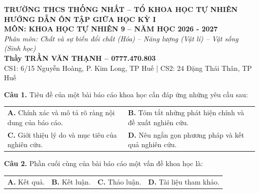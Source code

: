 \documentclass{article}
\begin{document}

\begin{center}
\vspace*{0.6cm}
{\fontsize{24}{30}\selectfont \textbf{TRƯỜNG THCS THỐNG NHẤT -- TỔ KHOA HỌC TỰ NHIÊN}}\\[0.6cm]
{\fontsize{34}{42}\selectfont \textbf{\color{brandGreen}HƯỚNG DẪN ÔN TẬP GIỮA HỌC KỲ I}}\\[0.4cm]
{\fontsize{28}{36}\selectfont \textbf{MÔN: KHOA HỌC TỰ NHIÊN 9 -- NĂM HỌC 2026 - 2027}}\\[1.0cm]
{\fontsize{24}{32}\selectfont \textit{Phân môn: Chất và sự biến đổi chất (Hóa) -- Năng lượng (Vật lí) -- Vật sống (Sinh học)}}\\[1.2cm]
{\fontsize{24}{30}\selectfont \textbf{\color{brandRed}Thầy TRẦN VĂN THẠNH -- 0777.470.803}}\\[0.3cm]
{\fontsize{20}{26}\selectfont CS1: 6/15 Nguyễn Hoàng, P. Kim Long, TP Huế \quad | \quad CS2: 24 Đặng Thái Thân, TP Huế}
\end{center}
\newpage


\fontsize{26}{34}\selectfont
\textbf{Câu 1.} Tiêu đề của một bài báo cáo khoa học cần đáp ứng những yêu cầu sau:
\vspace{6pt}

\begin{tabularx}{\linewidth}{@{}X X@{}}
\textbf{A.} Chính xác và mô tả rõ ràng nội dung của báo cáo. & \textbf{B.} Tóm tắt những phát hiện chính và đề xuất nghiên cứu.\\[8pt]
\textbf{C.} Giới thiệu lý do và mục tiêu của nghiên cứu. & \textbf{D.} Nêu ngắn gọn phương pháp và kết quả nghiên cứu.
\end{tabularx}

\vspace*{\fill}

\textbf{Câu 2.} Phần cuối cùng của bài báo cáo một vấn đề khoa học là:
\vspace{6pt}

\begin{tabularx}{\linewidth}{@{}X X X X@{}}
\textbf{A.} Kết quả. & \textbf{B.} Kết luận. & \textbf{C.} Thảo luận. & \textbf{D.} Tài liệu tham khảo.
\end{tabularx}
\vspace*{\fill}
\newpage
\end{document}

